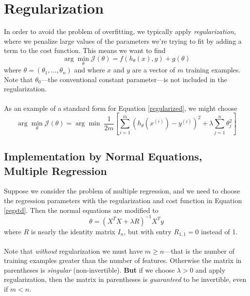 \documentclass[12pt]{article}
\begin{document}
\section{Regularization}

In order to avoid the problem of overfitting, we typically apply
\emph{regularization}, where we penalize large values of the
parameters we're trying to fit by adding a term to the cost
function. This means we want to find
\begin{equation}
   \label{regularized}
   \arg \min_\theta \mathcal{J}(\theta) = f\left(h_\theta(x), y\right)
   + g(\theta)
\end{equation}
where $\theta = (\theta_1, \ldots, \theta_n)$ and where $x$ and
$y$ are a vector of $m$ training examples. Note that
$\theta_0$---the conventional constant parameter---is not included
in the regularization.
\\
\\
As an example of a standard form for Equation \ref{regularized},
we might choose
\begin{equation}
   \label{regstd}
   \arg \min_\theta \mathcal{J}(\theta) = \arg\min \;
   \frac{1}{2m}\left[ \sum^m_{i=1} \left(h_\theta(x^{(i)})-y^{(i)}
   \right)^2 + \lambda \sum^n_{j=1} \theta_j^2
   \right]
\end{equation}


\subsection{Implementation by Normal Equations, Multiple Regression}

Suppose we consider the problem of multiple regression, and we
need to choose the regression parameters with the regularization
and cost function in Equation \ref{regstd}. Then the normal equations
are modified to
\begin{equation}
   \label{normreg}
   \theta = \left(X^T X + \lambda R\right)^{-1}  X^T y
\end{equation}
where $R$ is nearly the identity matrix $I_n$, but with entry
$R_{1,1}=0$ instead of 1.
\\
\\
Note that \emph{without} regularization
we must have $m\geq n$---that is the number of training
examples greater than the number of features. Otherwise the
matrix in parentheses is \emph{singular} (non-invertible).
\textbf{But} if we choose $\lambda>0$ and apply regularization,
then the matrix in parentheses is \emph{guaranteed} to
be invertible, even if $m < n$.
\end{document}
